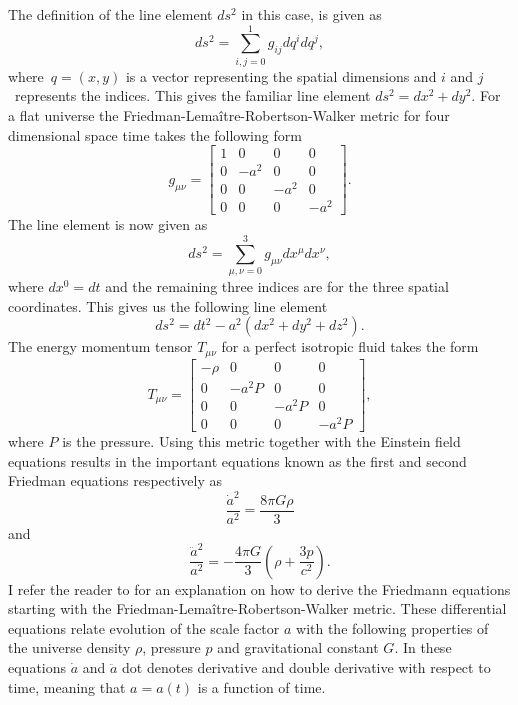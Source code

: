 The definition of the line element $ds^2$ in this case, is given as
\begin{equation}
    ds^2 = \sum_{i,j=0}^1g_{ij}dq^idq^j,
\end{equation}
where $q=(x, y)$ is a vector representing the spatial dimensions and $i$ and $j$ represents the indices.
This gives the familiar line element $ds^2=dx^2+dy^2$.
For a flat universe the Friedman-Lemaître-Robertson-Walker metric for four dimensional space time takes the following form
\begin{equation}
    g_{\mu\nu}=
    \begin{bmatrix}
        1 & 0 & 0 & 0\\
        0 & -a^2 & 0 & 0\\
        0 & 0 & -a^2 & 0\\
        0 & 0 & 0 & -a^2 
    \end{bmatrix}.
\end{equation}
The line element is now given as 
\begin{equation}
    ds^2 = \sum_{\mu,\nu=0}^3g_{\mu\nu}dx^\mu dx^\nu,
\end{equation}
where $dx^0=dt$ and the remaining three indices are for the three spatial coordinates.
This gives us the following line element
\begin{equation}
    ds^2 = dt^2 -a^2(dx^2 + dy^2 + dz^2).
\end{equation}
The energy momentum tensor $T_{\mu\nu}$ for a perfect isotropic fluid takes the
form
\begin{equation}
    T_{\mu\nu}=
    \begin{bmatrix}
        -\rho & 0 & 0 & 0\\
        0 & -a^2P & 0 & 0\\
        0 & 0 & -a^2P & 0\\
        0 & 0 & 0 & -a^2P 
    \end{bmatrix},
\end{equation}
where $P$ is the pressure.
Using this metric together with the Einstein field equations results in the important
equations known as the first and second Friedman equations respectively as
\begin{equation}\label{eq:F1}
    \frac{\dot{a}^2}{a^2} = \frac{8\pi G\rho}{3}
\end{equation}
and
\begin{equation}\label{eq:FII}
    \frac{\ddot{a}^2}{a^2} = -\frac{4\pi G}{3}(\rho + \frac{3p}{c^2}).
\end{equation}
I refer the reader to \cite[ch. 2]{Dodelson:1282338} for an explanation on how to derive the Friedmann equations starting with the Friedman-Lemaître-Robertson-Walker metric.
These differential equations relate evolution of the scale factor $a$ with the
following properties of the universe density $\rho$, pressure $p$ and gravitational
constant $G$. In these equations $\dot{a}$ and $\ddot{a}$ dot denotes
derivative and double derivative with respect to time, meaning that $a=a(t)$ is a
function of time. \\

